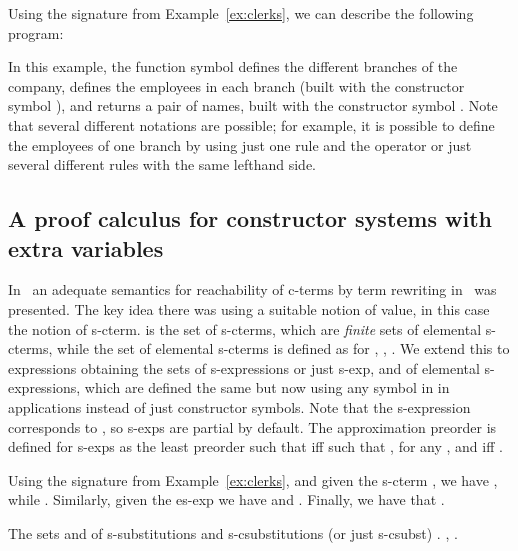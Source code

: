 \begin{example}\label{ex:rules}
Using the signature from Example~\ref{ex:clerks}, we can describe the following
program:

In this example, the function symbol  defines the different branches of the
company,  defines the employees in each branch (built with the constructor
symbol ), and  returns a pair of names, built with the constructor symbol .
Note that several different notations are possible; for example, it is possible to define
the employees of one branch by using just one rule and the  operator or just several
different rules with the same lefthand side. 
\end{example}



\subsection{A proof calculus for constructor systems with extra variables}
In~\cite{Lopez-FraguasRS09-RTA09} an adequate semantics for reachability of c-terms by term rewriting in
\ctrss\ was presented. The key idea there was using a suitable notion of value, in this case
the notion of s-cterm.
 is the set of s-cterms, which are 
\emph{finite} sets of elemental s-cterms, while the set  of elemental s-cterms is defined as 
 for , , 
. We extend this  to expressions obtaining 
the sets  of s-expressions or just s-exp, and  of elemental s-expressions, which are defined 
the same but now using any symbol in  in applications instead of just constructor symbols. Note 
that the s-expression  corresponds to , so s-exps are partial by default. The approximation
preorder  is defined for s-exps as the least preorder such that 
iff  such that , 
for any , and  
iff .


\begin{example}
Using the signature from Example~\ref{ex:clerks}, and given the s-cterm
  ,
we have , while .
Similarly, given the es-exp
  we have 
and . Finally, we have that .
\end{example}

The sets  and  of s-substitutions and s-csubstitutions (or just s-csubst) .  
, \shorttxt{, }. 
 
